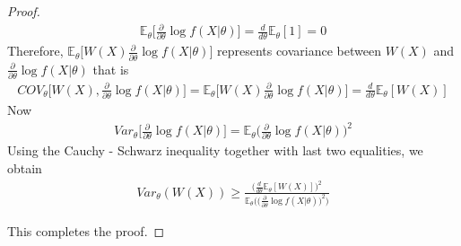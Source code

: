 \documentclass[a4paper,english,12pt]{article}
\begin{document}
\begin{proof}
\begin{align*}
\mathbb{E}_\theta \Big[\frac{\partial}{\partial \theta}\log f(X | \theta) \Big] = \frac{d}{d\theta} \mathbb{E}_\theta[1] = 0
\end{align*}
Therefore,
$\mathbb{E}_\theta \Big[ W(X) \frac{\partial}{\partial \theta}\log f(X | \theta) \Big]$ represents covariance between $W(X)$ and $\frac{\partial}{\partial \theta}\log f(X | \theta)$ that is 
\begin{align*}
COV_\theta \Big[ W(X), \frac{\partial}{\partial \theta}\log f(X | \theta) \Big] = \mathbb{E}_\theta \Big[ W(X) \frac{\partial}{\partial \theta}\log f(X | \theta) \Big] = \frac{d}{d\theta}\mathbb{E}_\theta[W(X)]
\end{align*}
Now 
\begin{align*}
Var_\theta \Big[\frac{\partial}{\partial \theta}\log f(X | \theta) \Big] = \mathbb{E}_\theta \Big(\frac{\partial}{\partial \theta}\log f(X | \theta) \Big)^2
\end{align*}
Using the Cauchy - Schwarz inequality together with last two equalities, we obtain
\begin{align*}
Var_\theta(W(X)) \geq \frac{\Big(\frac{d}{d\theta}\mathbb{E}_\theta[W(X)] \Big)^2}{\mathbb{E}_\theta \Big(\big(\frac{\partial}{\partial \theta} \log f(X | \theta)\big)^2\Big)}
\end{align*}

This completes the proof.
\end{proof}
   
\end{document}
